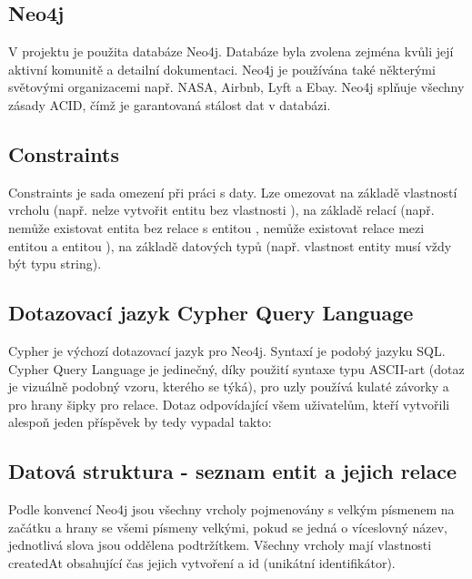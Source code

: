\documentclass[12pt, a4paper,
 twoside,        %
 openright
]{report}
\begin{document}
\subsection{Neo4j}
V projektu je použita databáze Neo4j. Databáze byla zvolena zejména kvůli její aktivní komunitě a detailní dokumentaci. Neo4j je používána také některými světovými organizacemi např. NASA, Airbnb, Lyft a Ebay. Neo4j splňuje všechny zásady ACID, čímž je garantovaná stálost dat v databázi. \cite{aboutNeo4j}
\subsection{Constraints}
Constraints je sada omezení při práci s daty. Lze omezovat na základě vlastností vrcholu (např. nelze vytvořit entitu  bez vlastnosti ), na základě relací (např. nemůže existovat entita  bez relace  s entitou , nemůže existovat relace  mezi entitou  a entitou ), na základě datových typů (např. vlastnost  entity  musí vždy být typu string).

\subsection{Dotazovací jazyk Cypher Query Language}
Cypher je výchozí dotazovací jazyk pro Neo4j. Syntaxí je podobý jazyku SQL. Cypher Query Language je jedinečný, díky použití syntaxe typu ASCII-art (dotaz je vizuálně podobný vzoru, kterého se týká), pro uzly používá kulaté závorky a pro hrany šipky pro relace. Dotaz odpovídající všem uživatelům, kteří vytvořili alespoň jeden příspěvek by tedy vypadal takto:  \cite{CypherQL}

\subsection{Datová struktura - seznam entit a jejich relace}
Podle konvencí Neo4j jsou všechny vrcholy pojmenovány s velkým písmenem na začátku a hrany se všemi písmeny velkými, pokud se jedná o víceslovný název, jednotlivá slova jsou oddělena podtržítkem. \cite{Neo4jNamingRules}
Všechny vrcholy mají vlastnosti createdAt obsahující čas jejich vytvoření a id (unikátní identifikátor).
\end{document}
